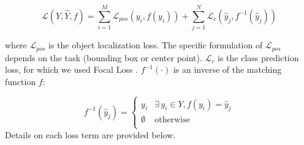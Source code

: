 \begin{equation} \label{eq:set_loss}
\mathcal{L}(Y, \hat{Y}, f ) = \sum_{i=1}^{M} \mathcal{L}_{pos}(y_i, f(y_i)) +  \sum_{j=1}^{N} \mathcal{L}_c (\hat{y}_j, f^{-1}(\hat{y}_j))
\end{equation}

where $\mathcal{L}_{pos}$ is the object localization loss. The specific formulation of $\mathcal{L}_{pos}$ depends on the task (bounding box or center point). $\mathcal{L}_c$ is the class prediction loss, for which we used Focal Loss \cite{linFocalLossDense2018}. $f^{-1}(\cdot)$ is an inverse of the matching function $f$:

\begin{equation*}
f^{-1}(\hat{y}_j) =
\begin{cases}
y_i & \exists \, y_i \in Y, f(y_i) = \hat{y}_j \\
\emptyset & \text{otherwise} \\
\end{cases}
\end{equation*}
Details on each loss term are provided below.


